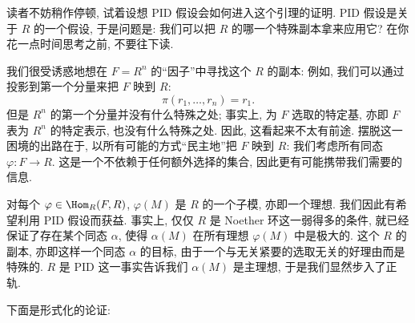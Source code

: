 读者不妨稍作停顿, 试着设想 PID 假设会如何进入这个引理的证明. PID 假设是关于 $R$ 的一个假设, 于是问题是: 我们可以把 $R$ 的哪一个特殊副本拿来应用它? 在你花一点时间思考之前, 不要往下读.

我们很受诱惑地想在 $F=R^n$ 的``因子''中寻找这个 $R$ 的副本: 例如, 我们可以通过投影到第一个分量来把 $F$ 映到 $R$:
$$
\pi(r_1,\ldots,r_n)=r_1.
$$
但是 $R^n$ 的第一个分量并没有什么特殊之处; 事实上, 为 $F$ 选取的特定基, 亦即 $F$ 表为 $R^n$ 的特定表示, 也没有什么特殊之处. 因此, 这看起来不太有前途. 摆脱这一困境的出路在于, 以所有可能的方式``民主地''把 $F$ 映到 $R$: 我们考虑所有同态 $\varphi:F\to R$. 这是一个不依赖于任何额外选择的集合, 因此更有可能携带我们需要的信息.

对每个 $\varphi\in\Hom_R(F,R)$, $\varphi(M)$ 是 $R$ 的一个子模, 亦即一个理想. 我们因此有希望利用 PID 假设而获益. 事实上, 仅仅 $R$ 是 Noether 环这一弱得多的条件, 就已经保证了存在某个同态 $\alpha$, 使得 $\alpha(M)$ 在所有理想 $\varphi(M)$ 中是极大的. 这个 $R$ 的副本, 亦即这样一个同态 $\alpha$ 的目标, 由于一个与无关紧要的选取无关的好理由而是特殊的. $R$ 是 PID 这一事实告诉我们 $\alpha(M)$ 是主理想, 于是我们显然步入了正轨.

下面是形式化的论证:

